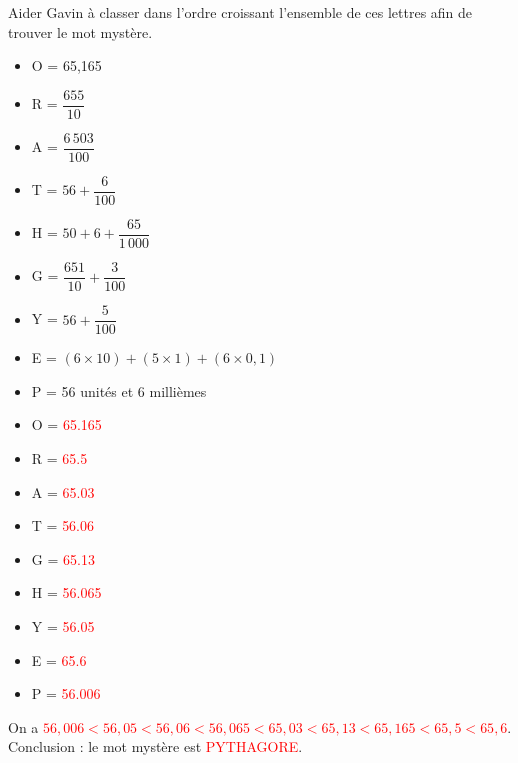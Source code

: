 \begin{exercice} %
    Aider Gavin à classer dans l'ordre croissant l'ensemble de ces lettres afin de trouver le mot mystère. \smallskip
    \begin{itemize}
       \item O = 65,165 \medskip
       \item R = $\dfrac{655}{10}$ \medskip
       \item A = $\dfrac{6\,503}{100}$ \medskip
       \item T = $56+\dfrac{6}{100}$ \medskip
       \item H = $50+6+\dfrac{65}{1\,000}$ \medskip
       \item G = $\dfrac{651}{10}+\dfrac{3}{100}$ \medskip
       \item Y = $56+\dfrac{5}{100}$ \medskip
       \item E = $(6\times10)+(5\times1)+(6\times0,1)$ \smallskip
       \item P = 56 unités et 6 millièmes
    \end{itemize}    
 \end{exercice}
 
 \begin{corrige}
    \begin{itemize}
       \item O = \textcolor{red}{\num{65,165}}
       \item R = \textcolor{red}{\num{65,5}}
       \item A = \textcolor{red}{\num{65,03}}
       \item T = \textcolor{red}{\num{56,06}}
       \item G = \textcolor{red}{\num{65,13}}
       \item H = \textcolor{red}{\num{56,065}}
       \item Y = \textcolor{red}{\num{56,05}}
       \item E = \textcolor{red}{\num{65,6}}
       \item P = \textcolor{red}{\num{56,006}}
    \end{itemize}
    On a \textcolor{red}{$56,006 < 56,05 < 56,06 < 56,065 < 65,03 < 65,13 < 65,165 < 65,5 < 65,6$}. \\
    Conclusion : le mot mystère est \textcolor{red}{PYTHAGORE}. \\
 \end{corrige}